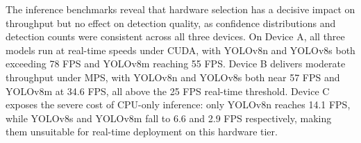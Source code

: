 The inference benchmarks reveal that hardware selection has a decisive impact on throughput but no effect on detection quality, as confidence distributions and detection counts were consistent across all three devices. On Device A, all three models run at real-time speeds under CUDA, with YOLOv8n and YOLOv8s both exceeding 78 FPS and YOLOv8m reaching 55 FPS. Device B delivers moderate throughput under MPS, with YOLOv8n and YOLOv8s both near 57 FPS and YOLOv8m at 34.6 FPS, all above the 25 FPS real-time threshold. Device C exposes the severe cost of CPU-only inference: only YOLOv8n reaches 14.1 FPS, while YOLOv8s and YOLOv8m fall to 6.6 and 2.9 FPS respectively, making them unsuitable for real-time deployment on this hardware tier.